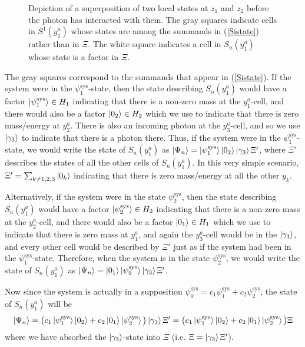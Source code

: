 \begin{figure}[ht!]

\vspace*{2px}
\caption{Depiction of a superposition of two local states at $z_1$ and $z_2$ before the photon has interacted with them. The gray squares indicate cells in $S^1(y^a_1)$ whose states are among the summands in (\ref{Sistate}) rather than in $\Xi$. The white square indicates a cell in $S_n(y^a_1)$ whose state is a factor in $\Xi$.}
\label{kentdeco1}
\end{figure}

The gray squares correspond to the summands that appear in (\ref{Sistate}). If the system were in the $\psi_1^\text{sys}$-state, then the state describing $S_n(y^a_1)$ would have a factor $\ket{\psi_1^\text{sys}}\in H_1$ indicating that there is a 
non-zero mass at the $y^a_1$-cell, and there would also be a factor $\ket{0_2}\in H_2$ which we use to indicate that there is zero mass/energy at $y^a_2$. 
There is also an incoming photon at the $y^a_3$-cell, and so we use $\ket{\gamma_3}$ to indicate that there is a photon there.
 Thus, if  the system  were in the $\psi_1^\text{sys}$-state, we would write the state of $S_n(y^a_1)$ 
 as $\ket{\Psi_n}=\ket{\psi_1^\text{sys}}\ket{0_2}\ket{\gamma_3}\Xi'$, where $\Xi'$ describes the states of all the other cells of $S_n(y^a_1)$. In this very simple scenario, $\Xi'=\sum_{k\neq 1,2,3}\ket{0_k}$ indicating that there is zero mass/energy at all the other $y_k$.

 Alternatively, if the system were in the state $\psi_2^\text{sys}$, then the state describing $S_n(y^a_1)$ would have a factor $\ket{\psi_2^\text{sys}}\in H_2$ 
 indicating that there is a non-zero mass at the $y^a_2$-cell, and there would also be a factor $\ket{0_1}\in H_1$ which we use to indicate that there is zero mass at $y^a_1$,
  and again the $y^a_3$-cell would be in the $\ket{\gamma_3}$, and every other cell would be described by  $\Xi'$  just as if the system had been in the $\psi_1^\text{sys}$-state. Therefore, when the system is in the state $\psi_2^\text{sys}$, we would write the state of $S_n(y^a_1)$ as $\ket{\Psi_n}=\ket{0_1}\ket{\psi_2^\text{sys}}\ket{\gamma_3}\Xi'$. 
 
 Now since the system is actually in a supposition $\psi_0^\text{sys} = c_1\psi_1^\text{sys}+c_2\psi_2^\text{sys}$, the state of $S_n(y^a_1)$ will be 
 \begin{equation*}
 \ket{\Psi_n}=\big(c_1\ket{\psi_1^\text{sys}}\ket{0_2}+c_2\ket{0_1}\ket{\psi_2^\text{sys}}\big)\ket{\gamma_3}\Xi'=\big(c_1\ket{\psi_1^\text{sys}}\ket{0_2}+c_2\ket{0_1}\ket{\psi_2^\text{sys}}\big)\Xi
 \end{equation*}
where we have absorbed the $\ket{\gamma_3}$-state into $\Xi$ (i.e. $\Xi= \ket{\gamma_3}\Xi'$).

